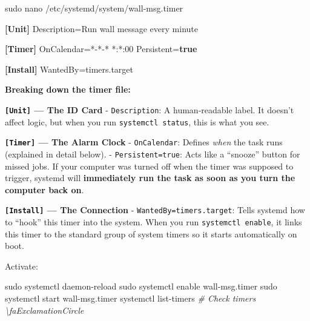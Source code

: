 \documentclass[
  english,
  paper=a4,
  oneside  ,captions=tableheading
]{scrartcl}
\newenvironment{Shaded}{}{}
\newcommand{\CommentTok}[1]{\textcolor[rgb]{0.38,0.63,0.69}{\textit{#1}}}
\newcommand{\DataTypeTok}[1]{\textcolor[rgb]{0.56,0.13,0.00}{#1}}
\newcommand{\ExtensionTok}[1]{#1}
\newcommand{\FunctionTok}[1]{\textcolor[rgb]{0.02,0.16,0.49}{#1}}
\newcommand{\KeywordTok}[1]{\textcolor[rgb]{0.00,0.44,0.13}{\textbf{#1}}}
\newcommand{\NormalTok}[1]{#1}
\newcommand{\OtherTok}[1]{\textcolor[rgb]{0.00,0.44,0.13}{#1}}
\newcommand{\StringTok}[1]{\textcolor[rgb]{0.25,0.44,0.63}{#1}}
\begin{document}
\begin{Shaded}
\begin{Highlighting}[]
\FunctionTok{sudo}\NormalTok{ nano /etc/systemd/system/wall{-}msg.timer}
\end{Highlighting}
\end{Shaded}

\begin{Shaded}
\begin{Highlighting}[]
\KeywordTok{[Unit]}
\DataTypeTok{Description}\OtherTok{=}\StringTok{Run wall message every minute}

\KeywordTok{[Timer]}
\DataTypeTok{OnCalendar}\OtherTok{=}\StringTok{*{-}*{-}* *:*:00}
\DataTypeTok{Persistent}\OtherTok{=}\KeywordTok{true}

\KeywordTok{[Install]}
\DataTypeTok{WantedBy}\OtherTok{=}\StringTok{timers.target}
\end{Highlighting}
\end{Shaded}

\textbf{Breaking down the timer file:}

\textbf{\texttt{{[}Unit{]}} --- The ID Card} - \texttt{Description}: A
human-readable label. It doesn't affect logic, but when you run
\texttt{systemctl\ status}, this is what you see.

\textbf{\texttt{{[}Timer{]}} --- The Alarm Clock} - \texttt{OnCalendar}:
Defines \emph{when} the task runs (explained in detail below). -
\texttt{Persistent=true}: Acts like a ``snooze'' button for missed jobs.
If your computer was turned off when the timer was supposed to trigger,
systemd will \textbf{immediately run the task as soon as you turn the
computer back on}.

\textbf{\texttt{{[}Install{]}} --- The Connection} -
\texttt{WantedBy=timers.target}: Tells systemd how to ``hook'' this
timer into the system. When you run \texttt{systemctl\ enable}, it links
this timer to the standard group of system timers so it starts
automatically on boot.

Activate:

\begin{Shaded}
\begin{Highlighting}[]
\FunctionTok{sudo}\NormalTok{ systemctl daemon{-}reload}
\FunctionTok{sudo}\NormalTok{ systemctl enable wall{-}msg.timer}
\FunctionTok{sudo}\NormalTok{ systemctl start wall{-}msg.timer}
\ExtensionTok{systemctl}\NormalTok{ list{-}timers    }\CommentTok{\# Check timers \textbackslash{}faExclamationCircle}
\end{Highlighting}
\end{Shaded}
\end{document}
